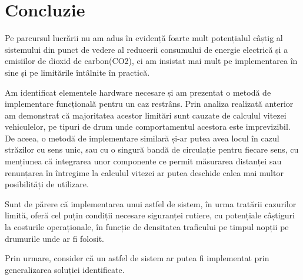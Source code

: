 \chapter{Concluzie}
\label{chap:fin}

Pe parcursul lucrării nu am adus în evidență foarte mult potențialul câștig al sistemului din punct de vedere al reducerii consumului de energie electrică și a emisiilor de dioxid de carbon(CO2), ci am insistat mai mult pe implementarea în sine și pe limitările întâlnite în practică. 

Am identificat elementele hardware necesare și am prezentat o metodă de implementare funcțională pentru un caz restrâns. Prin analiza realizată anterior am demonstrat că majoritatea acestor limitări sunt cauzate de calculul vitezei vehiculelor, pe tipuri de drum unde comportamentul acestora este imprevizibil. De aceea, o metodă de implementare similară și-ar putea avea locul în cazul străzilor cu sens unic, sau cu o singură bandă de circulație pentru fiecare sens, cu mențiunea că integrarea unor componente ce permit măsurarea distanței sau renunțarea în întregime la calculul vitezei ar putea deschide calea mai multor posibilități de utilizare. 


Sunt de părere că implementarea unui astfel de sistem, în urma tratării cazurilor limită, oferă cel puțin condiții necesare siguranței rutiere, cu potențiale câștiguri la costurile operaționale, în funcție de densitatea traficului pe timpul nopții pe drumurile unde ar fi folosit. 

Prin urmare, consider că un astfel de sistem ar putea fi implementat prin generalizarea soluției identificate.